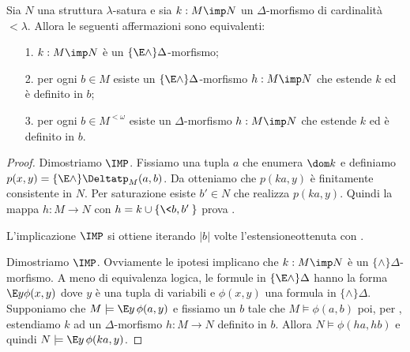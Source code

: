 % 

\begin{lemma}\label{lem_EDelta_estensione}
Sia $N$ una struttura $\lambda$-satura e sia $k:M\imp N$ un $\Delta$-morfismo di cardinalit\`a $<\lambda$. Allora le seguenti affermazioni sono equivalenti:
\begin{itemize}
\item[1.] $k:M\imp N$ \`e un $\{\E\wedge\}\Delta$-morfismo;
\item[2.] per ogni $b\in M$ esiste un $\{\E\wedge\}\Delta$-morfismo $h:M\imp N$ che estende $k$ ed \`e definito in $b$;
\item[3.] per ogni $b\in M^{<\omega}$ esiste un $\Delta$-morfismo $h:M\imp N$ che estende $k$ ed \`e definito in $b$.
\end{itemize}
\end{lemma}

\begin{proof}
Dimostriamo $\IMP$. Fissiamo una tupla $a$ che enumera $\dom k$ e definiamo $p(x,y)=\{\E\wedge\}\Deltatp_M (a,b)$. Da  otteniamo che $p(ka,y)$ \`e finitamente consistente in $N$. Per saturazione esiste $b'\in N$ che realizza $p(ka,y)$. Quindi la mappa $h:M\to N$ con $h=k\cup\{\<b,b'\>\}$ prova .

L'implicazione $\IMP$ si ottiene iterando $|b|$ volte l'estensioneottenuta con . 

Dimostriamo $\IMP$. Ovviamente le ipotesi implicano che $k:M\imp N$ \`e un $\{\wedge\}\Delta$-morfismo. A meno di equivalenza logica, le formule in $\{\E\wedge\}\Delta$ hanno la forma  $\E y \phi (x,y)$ dove $y$ \`e una tupla di variabili e $\phi(x,y)$ una formula in $\{\wedge\}\Delta$. Supponiamo che $M\models\E y\,\phi(a,y)$ e fissiamo un $b$ tale che $M\models\phi(a,b)$ poi, per , estendiamo $k$ ad un $\Delta$-morfismo $h:M\to N$ definito in $b$. Allora $N\models\phi(ha,hb)$ e quindi $N\models\E y\,\phi(ka,y)$.
\end{proof}


